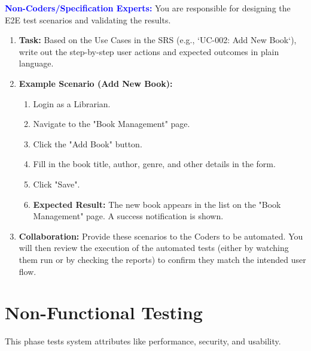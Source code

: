 \documentclass{article}
\newcommand{\role}[1]{\textbf{\textcolor{blue}{#1:}}}
\begin{document}
\role{Non-Coders/Specification Experts}
You are responsible for designing the E2E test scenarios and validating the results.
\begin{enumerate}
    \item \textbf{Task:} Based on the Use Cases in the SRS (e.g., `UC-002: Add New Book`), write out the step-by-step user actions and expected outcomes in plain language.
    \item \textbf{Example Scenario (Add New Book):}
    \begin{enumerate}
        \item Login as a Librarian.
        \item Navigate to the "Book Management" page.
        \item Click the "Add Book" button.
        \item Fill in the book title, author, genre, and other details in the form.
        \item Click "Save".
        \item \textbf{Expected Result:} The new book appears in the list on the "Book Management" page. A success notification is shown.
    \end{enumerate}
    \item \textbf{Collaboration:} Provide these scenarios to the Coders to be automated. You will then review the execution of the automated tests (either by watching them run or by checking the reports) to confirm they match the intended user flow.
\end{enumerate}

\section{Non-Functional Testing}
This phase tests system attributes like performance, security, and usability.
\end{document}
